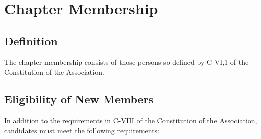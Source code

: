 \chapter{Chapter Membership}
\section{Definition} The chapter membership consists of those persons so defined by C-VI,1 of the Constitution of the Association.

\section{Eligibility of New Members}\label{by:elig}
In addition to the requirements in \href{http://www.tbp.org/off/ConstBylaw.pdf}{C-VIII of the Constitution of the Association}, candidates must meet the following requirements:
